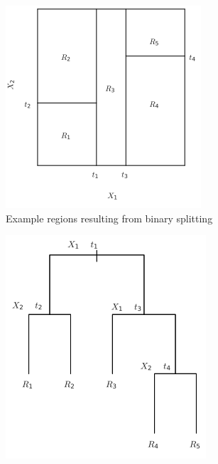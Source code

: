 			\begin{figure}[H]\centering
			    \begin{subfigure}[b]{0.3\textwidth}
			        \includegraphics[width=\textwidth]{sections/Classification/DecisionTrees/BinarySplitting/binarySplittingRegions.png}
			        \caption{Example regions resulting from binary splitting}
			        \label{fig:binarySplittingRegions}
			    \end{subfigure}
			    \hspace{0.5cm}
			    \begin{subfigure}[b]{0.3\textwidth}
			        \includegraphics[width=\textwidth]{sections/Classification/DecisionTrees/BinarySplitting/binarySplittingTree.png}

\end{subfigure}
\end{figure}
